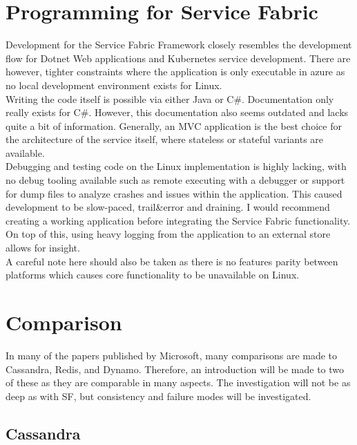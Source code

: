 \documentclass[a4paper,10pt,titlepage]{report}
\begin{document}
    \section{Programming for Service Fabric}
    
    Development for the Service Fabric Framework closely resembles the development flow for Dotnet Web applications and Kubernetes service development. There are however, tighter constraints where the application is only executable in azure as no local development environment exists for Linux. \\
    
    Writing the code itself is possible via either Java or C\#. Documentation only really exists for C\#. However, this documentation also seems outdated and lacks quite a bit of information. Generally, an MVC application is the best choice for the architecture of the service itself, where stateless or stateful variants are available.\\
    
    Debugging and testing code on the Linux implementation is highly lacking, with no debug tooling available such as remote executing with a debugger or support for dump files to analyze crashes and issues within the application. This caused development to be slow-paced, trail\&error and draining. I would recommend creating a working application before integrating the Service Fabric functionality. On top of this, using heavy logging from the application to an external store allows for insight.
   \\
   A careful note here should also be taken as there is no features parity between platforms which causes core functionality to be unavailable on Linux.



\section{Comparison}
In many of the papers published by Microsoft, many comparisons are made to Cassandra, Redis, and Dynamo. Therefore, an introduction will be made to two of these as they are comparable in many aspects. The investigation will not be as deep as with SF, but consistency and failure modes will be investigated.

    
    
\subsection{Cassandra}
\end{document}
